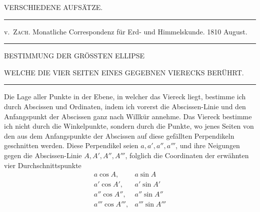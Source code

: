 \clearpage
{}
\begin{center}
{\Large VERSCHIEDENE AUFSÄTZE.}\par\bigskip
\rule{.85\textwidth}{.3pt}\par
v.\ \textsc{Zach}. Monatliche Correspondenz für Erd- und Himmelskunde. 1810 August.\par
\rule{.85\textwidth}{.3pt}\par\bigskip
BESTIMMUNG DER GRÖSSTEN ELLIPSE\par\medskip
WELCHE DIE VIER SEITEN EINES GEGEBNEN VIERECKS BERÜHRT.\par\bigskip
\rule{.15\textwidth}{.3pt}
\end{center}
\hspace*{\parindent}Die Lage aller Punkte in der Ebene, in welcher das Viereck liegt, bestimme ich durch Abscissen und Ordinaten, indem ich vorerst die Abscissen-Linie und den Anfangspunkt der Abscissen ganz nach Willkür annehme. Das Viereck bestimme ich nicht durch die Winkelpunkte, sondern durch die Punkte, wo jenes Seiten von den aus dem Anfangspunkte der Abscissen auf diese gefällten Perpendikeln geschnitten werden. Diese Perpendikel seien \(a,a',a'',a'''\), und ihre Neigungen gegen die Abscissen-Linie \(A,A',A'',A'''\), folglich die Coordinaten der erwähnten vier Durchschnittspunkte
\[
\begin{array}{ll}
a\cos A,&a\sin A\\
a'\cos A',&a'\sin A'\\
a''\cos A'',&a''\sin A''\\
a'''\cos A''',&a'''\sin A'''
\end{array}
\]
